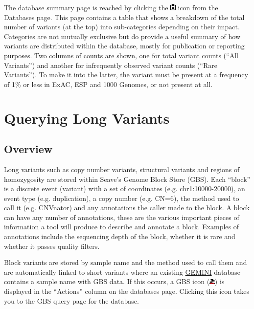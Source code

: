 \documentclass[11pt, a4paper]{article}
\newcommand{\GEMINI}{\href{https://gemini.readthedocs.io}{GEMINI} } %
\begin{document}
The database summary page is reached by clicking the \includegraphics[width=8pt]{clipboard_icon.png} icon from the Databases page. This page contains a table that shows a breakdown of the total number of variants (at the top) into sub-categories depending on their impact. Categories are not mutually exclusive but do provide a useful summary of how variants are distributed within the database, mostly for publication or reporting purposes. Two columns of counts are shown, one for total variant counts (``All Variants'') and another for infrequently observed variant counts (``Rare Variants''). To make it into the latter, the variant must be present at a frequency of 1\% or less in ExAC, ESP and 1000 Genomes, or not present at all.


\section{Querying Long Variants}\label{longVariantsQuery}

\subsection{Overview}

Long variants such as copy number variants, structural variants and regions of homozygosity are stored within Seave's Genome Block Store (GBS). Each ``block'' is a discrete event (variant) with a set of coordinates (e.g. chr1:10000-20000), an event type (e.g. duplication), a copy number (e.g. CN=6), the method used to call it (e.g. CNVnator) and any annotations the caller made to the block. A block can have any number of annotations, these are the various important pieces of information a tool will produce to describe and annotate a block. Examples of annotations include the sequencing depth of the block, whether it is rare and whether it passes quality filters. 

Block variants are stored by sample name and the method used to call them and are automatically linked to short variants where an existing \GEMINI database contains a sample name with GBS data. If this occurs, a GBS icon (\includegraphics[width=8pt]{GBS-Icon.png}) is displayed in the ``Actions'' column on the databases page. Clicking this icon takes you to the GBS query page for the database.
\end{document}
